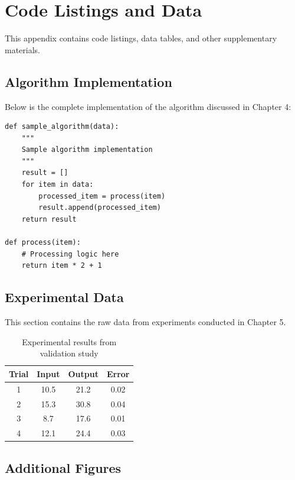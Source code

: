 \chapter{Code Listings and Data}

This appendix contains code listings, data tables, and other supplementary materials.

\section{Algorithm Implementation}

Below is the complete implementation of the algorithm discussed in Chapter 4:

\begin{verbatim}
def sample_algorithm(data):
    """
    Sample algorithm implementation
    """
    result = []
    for item in data:
        processed_item = process(item)
        result.append(processed_item)
    return result

def process(item):
    # Processing logic here
    return item * 2 + 1
\end{verbatim}

\section{Experimental Data}

This section contains the raw data from experiments conducted in Chapter 5.

\begin{table}[h]
\centering
\begin{tabular}{|c|c|c|c|}
\hline
Trial & Input & Output & Error \\
\hline
1 & 10.5 & 21.2 & 0.02 \\
2 & 15.3 & 30.8 & 0.04 \\
3 & 8.7 & 17.6 & 0.01 \\
4 & 12.1 & 24.4 & 0.03 \\
\hline
\end{tabular}
\caption{Experimental results from validation study}
\label{tab:experimental-data}
\end{table}

\section{Additional Figures}

\lipsum[5-6]